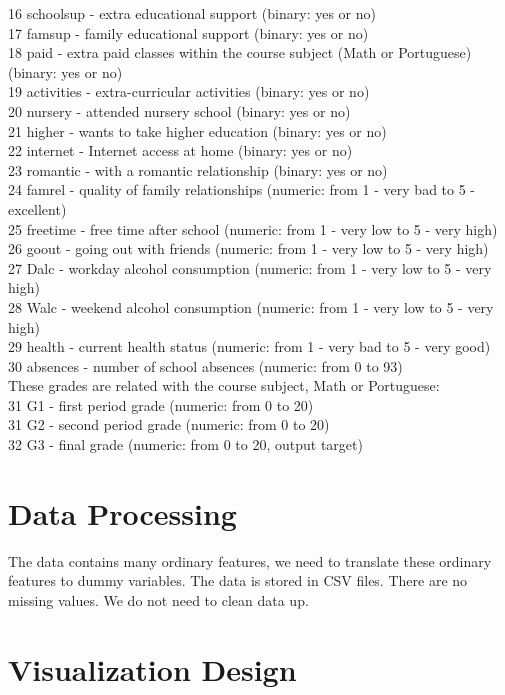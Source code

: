 \documentclass{article}
\begin{document}
16 schoolsup - extra educational support (binary: yes or no) \\
17 famsup - family educational support (binary: yes or no) \\
18 paid - extra paid classes within the course subject (Math or Portuguese) (binary: yes or no) \\
19 activities - extra-curricular activities (binary: yes or no) \\
20 nursery - attended nursery school (binary: yes or no) \\
21 higher - wants to take higher education (binary: yes or no) \\
22 internet - Internet access at home (binary: yes or no) \\
23 romantic - with a romantic relationship (binary: yes or no) \\
24 famrel - quality of family relationships (numeric: from 1 - very bad to 5 - excellent) \\
25 freetime - free time after school (numeric: from 1 - very low to 5 - very high) \\
26 goout - going out with friends (numeric: from 1 - very low to 5 - very high) \\
27 Dalc - workday alcohol consumption (numeric: from 1 - very low to 5 - very high) \\
28 Walc - weekend alcohol consumption (numeric: from 1 - very low to 5 - very high) \\
29 health - current health status (numeric: from 1 - very bad to 5 - very good) \\
30 absences - number of school absences (numeric: from 0 to 93) \\
These grades are related with the course subject, Math or Portuguese: \\
31 G1 - first period grade (numeric: from 0 to 20) \\
31 G2 - second period grade (numeric: from 0 to 20) \\
32 G3 - final grade (numeric: from 0 to 20, output target) \\
\section{Data Processing}
The data contains many ordinary features, we need to translate these ordinary features to dummy variables. The data is stored in CSV files. There are no missing values. We do not need to clean data up.
\section{Visualization Design}
\end{document}
